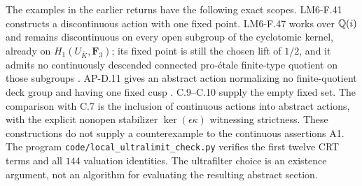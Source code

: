 The examples in the earlier returns have the following exact scopes.
LM6-F.41 constructs a discontinuous action with one fixed point.
LM6-F.47 works over $\mathbb Q(i)$ and remains discontinuous on every
open subgroup of the cyclotomic kernel, already on
$H_1(U_{\bar K},\mathbf F_3)$; its fixed point is still the chosen
lift of $1/2$, and it admits no continuously descended connected
pro-\'etale finite-type quotient on those subgroups
\cite[F.41, F.47]{AgentLM6}. AP-D.11 gives an abstract action
normalizing no finite-quotient deck group and having one fixed
cusp \cite[D.11]{AgentAP}. C.9--C.10 supply the empty fixed set.
The comparison with C.7 is the inclusion of continuous actions
into abstract actions, with the explicit nonopen stabilizer
$\ker(\epsilon\kappa)$ witnessing strictness. These constructions
do not supply a counterexample to the continuous assertions A1.
The program \texttt{code/local\_ultralimit\_check.py} verifies the
first twelve CRT terms and all $144$ valuation identities. The
ultrafilter choice is an existence argument, not an algorithm
for evaluating the resulting abstract section.
